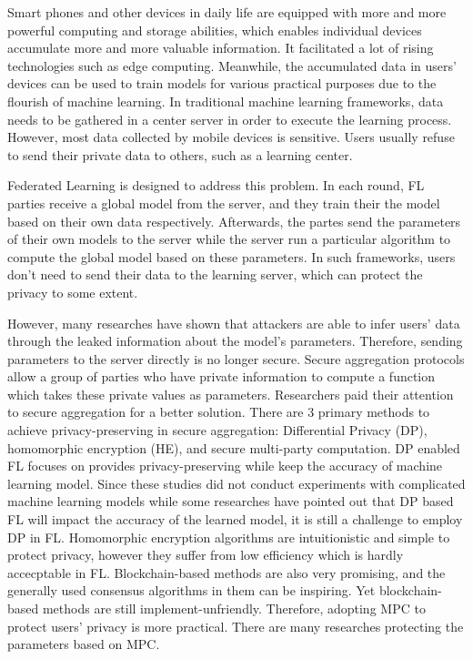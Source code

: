 Smart phones and other devices in daily life are equipped with more and more powerful computing and storage abilities, which enables individual devices accumulate more and more valuable information. It facilitated a lot of rising technologies such as edge computing. Meanwhile, the accumulated data in users' devices can be used to train models for various practical purposes due to the flourish of machine learning. In traditional machine learning frameworks, data needs to be gathered in a center server in order to execute the learning process. However, most data collected by mobile devices is sensitive. Users usually refuse to send their private data to others, such as a learning center. 

Federated Learning\cite{mcmahan2016communicationefficient} is designed to address this problem. In each round, FL parties receive a global model from the server, and they train their the model based on their own data respectively. Afterwards, the partes send the parameters of their own models to the server while the server run a particular algorithm to compute the global model based on these parameters. In such frameworks, users don't need to send their data to the learning server, which can protect the privacy to some extent.

However, many researches have shown that attackers are able to infer users' data through the leaked information about the model's parameters\cite{Beyond, Leakage}. Therefore, sending parameters to the server directly is no longer secure. Secure aggregation protocols allow a group of parties who have private information to compute a function which takes these private values as parameters. Researchers paid their attention to secure aggregation for a better solution\cite{shi2011privacy,RobustAgg,Bonawitz19,Nike,PrivFL}. There are 3 primary methods to achieve privacy-preserving in secure aggregation: Differential Privacy (DP), homomorphic encryption (HE), and secure multi-party computation. DP enabled FL focuses on provides privacy-preserving while keep the accuracy of machine learning model. Since these studies did not conduct experiments with complicated machine learning models while some researches have pointed out that DP based FL will impact the accuracy of the learned model\cite{Two-Phase}, it is still a challenge to employ DP in FL. Homomorphic encryption algorithms are intuitionistic and simple to protect privacy, however they suffer from low efficiency which is hardly accecptable in FL\cite{HESurvey}. Blockchain-based methods\cite{DeepChain,Lu2020,On-Device} are also very promising, and the generally used consensus algorithms in them can be inspiring. Yet blockchain-based methods are still implement-unfriendly. Therefore, adopting MPC to protect users' privacy is more practical. There are many researches protecting the parameters based on MPC\cite{Practical,Two-Phase,Weighted,Hybrid}. 


